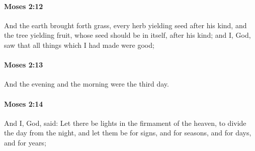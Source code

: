 		\paragraph{Moses 2:12} %
			\label{MOSES-2-12}

			And the earth brought forth grass, every herb yielding seed after his kind, and the tree yielding fruit, whose seed should be in itself, after his kind; and I, God, saw that all things which I had made were good;


		\paragraph{Moses 2:13} %
			\label{MOSES-2-13}

			And the evening and the morning were the third day.


		\paragraph{Moses 2:14} %
			\label{MOSES-2-14}

			And I, God, said: Let there be lights in the firmament of the heaven, to divide the day from the night, and let them be for signs, and for seasons, and for days, and for years;


